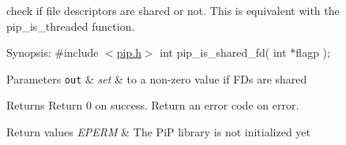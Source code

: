 check if file descriptors are shared or not. This is equivalent with the {\ttfamily pip\-\_\-is\-\_\-threaded} function.

\begin{DoxyParagraph}{Synopsis\-:}
\#include $<$\hyperlink{pip_8h_source}{pip.\-h}$>$ int pip\-\_\-is\-\_\-shared\-\_\-fd( int $\ast$flagp );
\end{DoxyParagraph}

\begin{DoxyParams}[1]{Parameters}
\mbox{\tt out}  & {\em set} & to a non-\/zero value if F\-Ds are shared\\
\hline
\end{DoxyParams}
\begin{DoxyReturn}{Returns}
Return 0 on success. Return an error code on error. 
\end{DoxyReturn}

\begin{DoxyRetVals}{Return values}
{\em E\-P\-E\-R\-M} & The Pi\-P library is not initialized yet \\
\hline
\end{DoxyRetVals}
